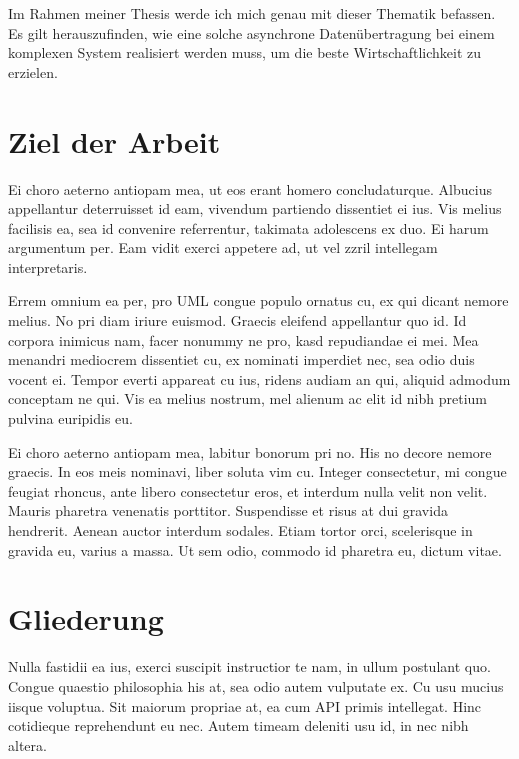 Im Rahmen meiner Thesis werde ich mich genau mit dieser Thematik befassen. Es gilt herauszufinden, wie eine solche asynchrone Datenübertragung bei einem komplexen System realisiert werden muss, um die beste Wirtschaftlichkeit zu erzielen.


%
%
\section{Ziel der Arbeit}
\label{sec:intro:goal}
Ei choro aeterno antiopam mea, ut eos erant homero concludaturque. Albucius appellantur deterruisset id eam, vivendum partiendo dissentiet ei ius. Vis melius facilisis ea, sea id convenire referrentur, takimata adolescens ex duo. Ei harum argumentum per. Eam vidit exerci appetere ad, ut vel zzril intellegam interpretaris.

Errem omnium ea per, pro \ac{UML} congue populo ornatus cu, ex qui dicant nemore melius. No pri diam iriure euismod. Graecis eleifend appellantur quo id. Id corpora inimicus nam, facer nonummy ne pro, kasd repudiandae ei mei. Mea menandri mediocrem dissentiet cu, ex nominati imperdiet nec, sea odio duis vocent ei. Tempor everti appareat cu ius, ridens audiam an qui, aliquid admodum conceptam ne qui. Vis ea melius nostrum, mel alienum ac elit id nibh pretium pulvina euripidis eu.

Ei choro aeterno antiopam mea, labitur bonorum pri no. His no decore nemore graecis. In eos meis nominavi, liber soluta vim cu. Integer consectetur, mi congue feugiat rhoncus, ante libero consectetur eros, et interdum nulla velit non velit. Mauris pharetra venenatis porttitor. Suspendisse et risus at dui gravida hendrerit. Aenean auctor interdum sodales. Etiam tortor orci, scelerisque in gravida eu, varius a massa. Ut sem odio, commodo id pharetra eu, dictum vitae. 

%
%
\section{Gliederung}
\label{sec:intro:structure}
Nulla fastidii ea ius, exerci suscipit instructior te nam, in ullum postulant quo. Congue quaestio philosophia his at, sea odio autem vulputate ex. Cu usu mucius iisque voluptua. Sit maiorum propriae at, ea cum \ac{API} primis intellegat. Hinc cotidieque reprehendunt eu nec. Autem timeam deleniti usu id, in nec nibh altera.